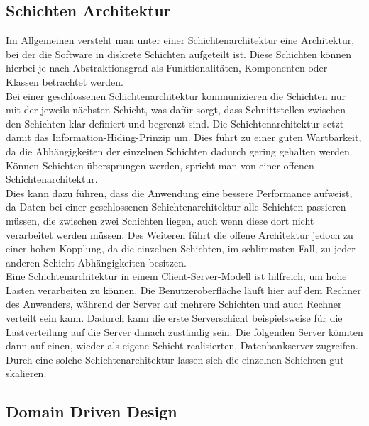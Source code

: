 \subsection{Schichten Architektur} %
\label{sub:Schichten Architektur}
Im Allgemeinen versteht man unter einer Schichtenarchitektur eine Architektur, bei der die Software in diskrete Schichten aufgeteilt ist.
Diese Schichten können hierbei je nach Abstraktionsgrad als Funktionalitäten, Komponenten oder Klassen betrachtet werden.\\
Bei einer geschlossenen Schichtenarchitektur kommunizieren die Schichten nur mit der jeweils nächsten Schicht, was dafür sorgt, dass Schnittstellen zwischen den Schichten klar definiert und begrenzt sind.
Die Schichtenarchitektur setzt damit das Information-Hiding-Prinzip um.
Dies führt zu einer guten Wartbarkeit, da die Abhängigkeiten der einzelnen Schichten dadurch gering gehalten werden.~\cite{softArchGrundl}\\
Können Schichten übersprungen werden, spricht man von einer offenen Schichtenarchitektur.~\cite{buschmann2007pattern}\\
Dies kann dazu führen, dass die Anwendung eine bessere Performance aufweist, da Daten bei einer geschlossenen Schichtenarchitektur alle Schichten passieren müssen, die zwischen zwei Schichten liegen, auch wenn diese dort nicht verarbeitet werden müssen.
Des Weiteren führt die offene Architektur jedoch zu einer hohen Kopplung, da die einzelnen Schichten, im schlimmsten Fall, zu jeder anderen Schicht Abhängigkeiten besitzen.\\
Eine Schichtenarchitektur in einem Client-Server-Modell ist hilfreich, um hohe Lasten verarbeiten zu können.
Die Benutzeroberfläche läuft hier auf dem Rechner des Anwenders, während der Server auf mehrere Schichten und auch Rechner verteilt sein kann.
Dadurch kann die erste Serverschicht beispielsweise für die Lastverteilung auf die Server danach zuständig sein.
Die folgenden Server könnten dann auf einen, wieder als eigene Schicht realisierten, Datenbankserver zugreifen.
Durch eine solche Schichtenarchitektur lassen sich die einzelnen Schichten gut skalieren.~\cite{softArchGrundl}

\subsection{Domain Driven Design} %
\label{sub:Domain_Driven_Design}



